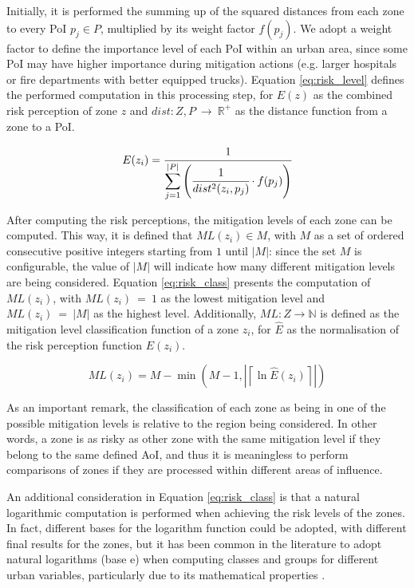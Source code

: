 \begin{refsection}
Initially, it is performed the summing up of the squared distances from each zone to every PoI $p_j \in P$, multiplied by its weight factor $f(p_j)$. We adopt a weight factor to define the importance level of each PoI within an urban area, since some PoI may have higher importance during mitigation actions (e.g. larger hospitals or fire departments with better equipped trucks). Equation \ref{eq:risk_level} defines the performed computation in this processing step, for $E(z)$ as the combined risk perception of zone $z$ and $dist:Z,P~\to~\mathbb{R^+}$ as the distance function from a zone to a PoI.

\begin{equation}
  \label{eq:risk_level}
  E(z_i) = \cfrac{1}{\displaystyle\sum_{j = 1}^{\lvert P \rvert}\left(\cfrac{1}{dist^2(z_i, p_j)} \cdot f(p_j)\right)} 
\end{equation}

After computing the risk perceptions, the mitigation levels of each zone can be computed. This way, it is defined that $ML(z_i) \in M$, with $M$ as a set of ordered consecutive positive integers starting from $1$ until $|M|$: since the set $M$ is configurable, the value of $|M|$ will indicate how many different mitigation levels are being considered. Equation \ref{eq:risk_class} presents the computation of $ML(z_i)$, with $ML(z_i)~=~1$ as the lowest mitigation level and $ML(z_i)~=~|M|$ as the highest level. Additionally, $ML:Z \to \mathbb{N}$ is defined as the mitigation level classification function of a zone $z_i$, for $\widehat{E}$ as the normalisation of the risk perception function $E(z_i)$. 

\begin{equation}
  \label{eq:risk_class}
  ML(z_i) = M - \min\left(M - 1, \left| \left\lceil \ln{\widehat{E}(z_i)} \right\rceil \right| \right)
\end{equation}

As an important remark, the classification of each zone as being in one of the possible mitigation levels is relative to the region being considered. In other words, a zone is as risky as other zone with the same mitigation level if they belong to the same defined AoI, and thus it is meaningless to perform comparisons of zones if they are processed within different areas of influence. 

An additional consideration in Equation \ref{eq:risk_class} is that a natural logarithmic computation is performed when achieving the risk levels of the zones. In fact, different bases for the logarithm function could be adopted, with different final results for the zones, but it has been common in the literature to adopt natural logarithms (base $\mathrm{e}$) when computing classes and groups for different urban variables, particularly due to its mathematical properties \cite{log3,log4,log1,log2}.


\end{refsection}
